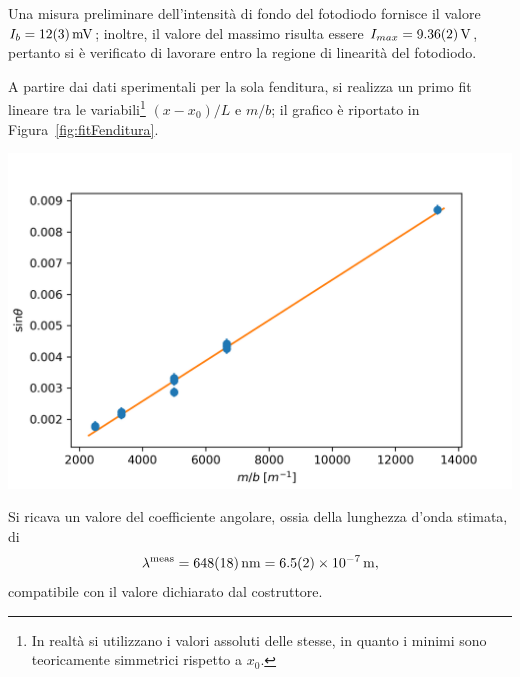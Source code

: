 \documentclass[10pt,oneside,a4paper]{article}
\newenvironment{Figure}
  {\par\medskip\noindent\minipage{\linewidth}}
  {\endminipage\par\medskip}
\begin{document}
\begin{multicols}{2}
Una misura preliminare dell'intensità di fondo del fotodiodo fornisce il valore ${I_b = \SI{12 \pm 3}{mV}}$; inoltre, il valore del massimo risulta essere $I_{max} = \SI{9.36 \pm 0.02}{V}$, pertanto si è verificato di lavorare entro la regione di linearità del fotodiodo.

A partire dai dati sperimentali per la sola fenditura, si realizza un primo fit lineare tra le variabili\footnote{In realtà si utilizzano i valori assoluti delle stesse, in quanto i minimi sono teoricamente simmetrici rispetto a $x_0$.} $(x-x_0) / L$ e $m/b$; il grafico è riportato in Figura~\ref{fig:fitFenditura}. 

\begin{Figure}
	\begin{center}
	\includegraphics[width=1.1\linewidth]{fitFenditura.png}
	\label{fig:fitFenditura}
	\end{center}
\end{Figure}

Si ricava un valore del coefficiente angolare, ossia della lunghezza d'onda stimata, di
\[
\lambda^{\text{meas}} = \SI{648 \pm 18}{nm} = \SI{6.5 \pm 0.2 e-7}{m},
\]
compatibile con il valore dichiarato dal costruttore. 


\end{multicols}
\end{document}
